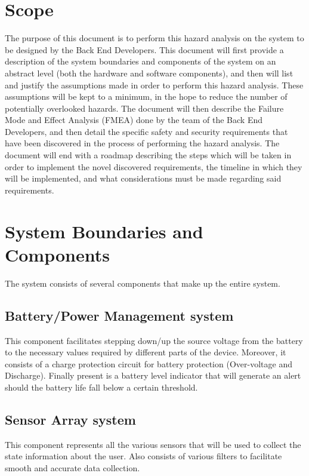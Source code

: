 \documentclass{article}
\begin{document}
\section{Scope}

The purpose of this document is to perform this hazard analysis on the system to be designed by the Back End Developers. This document will first provide a description of the system boundaries and components of the system on an abstract level (both the hardware and software components), and then will list and justify the assumptions made in order to perform this hazard analysis. These assumptions will be kept to a minimum, in the hope to reduce the number of potentially overlooked hazards. The document will then describe the Failure Mode and Effect Analysis (FMEA) done by the team of the Back End Developers, and then detail the specific safety and security requirements that have been discovered in the process of performing the hazard analysis. The document will end with a roadmap describing the steps which will be taken in order to implement the novel discovered requirements, the timeline in which they will be implemented, and what considerations must be made regarding said requirements.

\section{System Boundaries and Components}
The system consists of several components that make up the entire system.

\subsection{\label{Battery_sec}Battery/Power Management system}
This component facilitates stepping down/up the source voltage from the battery to the necessary values required by different parts of the device. Moreover, it consists of a 										charge protection circuit for battery protection (Over-voltage and Discharge). Finally present is a battery level indicator that will generate an alert should the battery life fall below a certain threshold.

\subsection{\label{Sensor_sec}Sensor Array system}
This component represents all the various sensors that will be used to collect the state information about the user. Also consists of various filters to facilitate smooth and accurate data collection.
\end{document}

